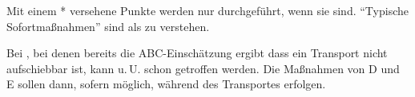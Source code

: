 \begin{BoxA}[%
title={Standardmaßnahme YY12100B: Einschätzungsblock},
fonttitle=\sffamily\bfseries\small,fontupper=\sffamily\small,
colframe=Base,
colback=MarginBackground,
]
\begin{minipage}[t]{\linewidth -
{2\fboxrule} - {2\fboxsep}}
\begin{minipage}[t]{\linewidth}
{\begin{center}
{ Mit einem * versehene Punkte werden nur durchgeführt,
wenn sie  sind. \enquote{Typische
Sofortmaßnahmen} sind als  zu verstehen. 

Bei , bei denen bereits die 
ABC-Einschätzung ergibt dass ein Transport nicht aufschiebbar ist, 
kann u.\,U. schon  
getroffen werden. 
Die Maßnahmen von D und E sollen dann, sofern möglich, während des 
Transportes erfolgen. }
\end{center}
}
\end{minipage}
\end{minipage}%
\end{BoxA}



\vfill









    	










